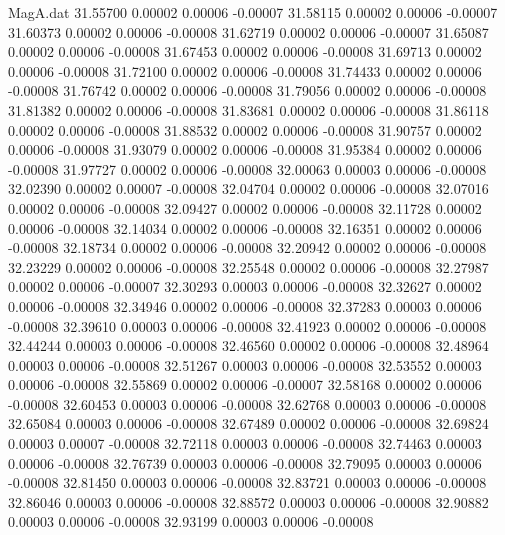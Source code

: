 \begin{filecontents}{MagA.dat}
  31.55700    0.00002    0.00006   -0.00007
  31.58115    0.00002    0.00006   -0.00007
  31.60373    0.00002    0.00006   -0.00008
  31.62719    0.00002    0.00006   -0.00007
  31.65087    0.00002    0.00006   -0.00008
  31.67453    0.00002    0.00006   -0.00008
  31.69713    0.00002    0.00006   -0.00008
  31.72100    0.00002    0.00006   -0.00008
  31.74433    0.00002    0.00006   -0.00008
  31.76742    0.00002    0.00006   -0.00008
  31.79056    0.00002    0.00006   -0.00008
  31.81382    0.00002    0.00006   -0.00008
  31.83681    0.00002    0.00006   -0.00008
  31.86118    0.00002    0.00006   -0.00008
  31.88532    0.00002    0.00006   -0.00008
  31.90757    0.00002    0.00006   -0.00008
  31.93079    0.00002    0.00006   -0.00008
  31.95384    0.00002    0.00006   -0.00008
  31.97727    0.00002    0.00006   -0.00008
  32.00063    0.00003    0.00006   -0.00008
  32.02390    0.00002    0.00007   -0.00008
  32.04704    0.00002    0.00006   -0.00008
  32.07016    0.00002    0.00006   -0.00008
  32.09427    0.00002    0.00006   -0.00008
  32.11728    0.00002    0.00006   -0.00008
  32.14034    0.00002    0.00006   -0.00008
  32.16351    0.00002    0.00006   -0.00008
  32.18734    0.00002    0.00006   -0.00008
  32.20942    0.00002    0.00006   -0.00008
  32.23229    0.00002    0.00006   -0.00008
  32.25548    0.00002    0.00006   -0.00008
  32.27987    0.00002    0.00006   -0.00007
  32.30293    0.00003    0.00006   -0.00008
  32.32627    0.00002    0.00006   -0.00008
  32.34946    0.00002    0.00006   -0.00008
  32.37283    0.00003    0.00006   -0.00008
  32.39610    0.00003    0.00006   -0.00008
  32.41923    0.00002    0.00006   -0.00008
  32.44244    0.00003    0.00006   -0.00008
  32.46560    0.00002    0.00006   -0.00008
  32.48964    0.00003    0.00006   -0.00008
  32.51267    0.00003    0.00006   -0.00008
  32.53552    0.00003    0.00006   -0.00008
  32.55869    0.00002    0.00006   -0.00007
  32.58168    0.00002    0.00006   -0.00008
  32.60453    0.00003    0.00006   -0.00008
  32.62768    0.00003    0.00006   -0.00008
  32.65084    0.00003    0.00006   -0.00008
  32.67489    0.00002    0.00006   -0.00008
  32.69824    0.00003    0.00007   -0.00008
  32.72118    0.00003    0.00006   -0.00008
  32.74463    0.00003    0.00006   -0.00008
  32.76739    0.00003    0.00006   -0.00008
  32.79095    0.00003    0.00006   -0.00008
  32.81450    0.00003    0.00006   -0.00008
  32.83721    0.00003    0.00006   -0.00008
  32.86046    0.00003    0.00006   -0.00008
  32.88572    0.00003    0.00006   -0.00008
  32.90882    0.00003    0.00006   -0.00008
  32.93199    0.00003    0.00006   -0.00008

\end{filecontents}
